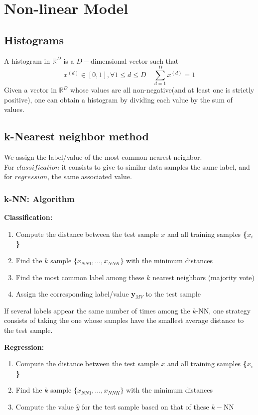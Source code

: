 
\section{Non-linear Model}
\subsection{Histograms}
A histogram in $\mathbb{R}^D$ is a $D-$dimensional vector such that \[
  x^{\left(d\right)} \in [0,1], \forall 1 \leq d \leq D \quad
  \sum_{d=1}^{D}x^{\left(d\right)} = 1 
\]
Given a vector in $\mathbb{R}^D$ whose values are all non-negative(and at least one is strictly positive), 
one can obtain a histogram by dividing each value by the sum of values. 

\subsection{k-Nearest neighbor method}
We assign the label/value of the most common nearest neighbor. \\
For $classification$ it consists to give to similar data samples the same label, and for $regression$, the same associated value.

\subsubsection{k-NN: Algorithm}
\textbf{Classification:}
\begin{enumerate}
  \item Compute the distance between the test sample $x$ and all training samples \textbf{\{$x_i$\}}
  \item Find the $k$ sample $\{ x_{NN1}, \dots, x_{NNK} \}$ with the minimum distances
  \item Find the most common label among these $k$ nearest neighbors (majority vote)
  \item Assign the corresponding label/value \textbf{y}$_{MV}$ to the test sample
\end{enumerate}
If several labels appear the same number of times among the $k$-NN, one strategy
consists of taking the one whose samples have the smallest average distance to
the test sample.

\textbf{Regression:}
\begin{enumerate}
  \item Compute the distance between the test sample $x$ and all training samples \textbf{\{$x_i$\}}
  \item Find the $k$ sample $\{ x_{NN1}, \dots, x_{NNK} \}$ with the minimum distances
  \item Compute the value $\hat{y}$ for the test sample based on that of these $k-$NN
\end{enumerate}

